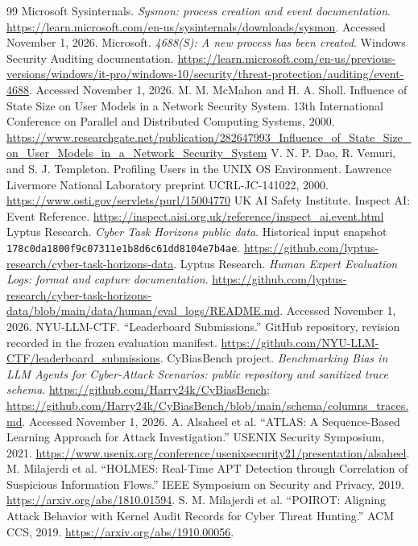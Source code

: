 \documentclass[10pt]{article}
\begin{document}
\begin{thebibliography}{99}
 Microsoft Sysinternals. \emph{Sysmon: process creation and event documentation}. \url{https://learn.microsoft.com/en-us/sysinternals/downloads/sysmon}. Accessed November 1, 2026.
 Microsoft. \emph{4688(S): A new process has been created}. Windows Security Auditing documentation. \url{https://learn.microsoft.com/en-us/previous-versions/windows/it-pro/windows-10/security/threat-protection/auditing/event-4688}. Accessed November 1, 2026.
 M. M. McMahon and H. A. Sholl. Influence of State Size on User Models in a Network Security System. 13th International Conference on Parallel and Distributed Computing Systems, 2000. \url{https://www.researchgate.net/publication/282647993_Influence_of_State_Size_on_User_Models_in_a_Network_Security_System}
 V. N. P. Dao, R. Vemuri, and S. J. Templeton. Profiling Users in the UNIX OS Environment. Lawrence Livermore National Laboratory preprint UCRL-JC-141022, 2000. \url{https://www.osti.gov/servlets/purl/15004770}
 UK AI Safety Institute. Inspect AI: Event Reference. \url{https://inspect.aisi.org.uk/reference/inspect_ai.event.html}
 Lyptus Research. \emph{Cyber Task Horizons public data}. Historical input snapshot \texttt{178c0da1800f9c07311e1b8d6c61dd8104e7b4ae}. \url{https://github.com/lyptus-research/cyber-task-horizons-data}.
 Lyptus Research. \emph{Human Expert Evaluation Logs: format and capture documentation}. \url{https://github.com/lyptus-research/cyber-task-horizons-data/blob/main/data/human/eval_logs/README.md}. Accessed November 1, 2026.
 NYU-LLM-CTF. ``Leaderboard Submissions.'' GitHub repository, revision recorded in the frozen evaluation manifest. \url{https://github.com/NYU-LLM-CTF/leaderboard_submissions}.
 CyBiasBench project. \emph{Benchmarking Bias in LLM Agents for Cyber-Attack Scenarios: public repository and sanitized trace schema}. \url{https://github.com/Harry24k/CyBiasBench}; \url{https://github.com/Harry24k/CyBiasBench/blob/main/schema/columns_traces.md}. Accessed November 1, 2026.
 A. Alsaheel et al. ``ATLAS: A Sequence-Based Learning Approach for Attack Investigation.'' USENIX Security Symposium, 2021. \url{https://www.usenix.org/conference/usenixsecurity21/presentation/alsaheel}.
 M. Milajerdi et al. ``HOLMES: Real-Time APT Detection through Correlation of Suspicious Information Flows.'' IEEE Symposium on Security and Privacy, 2019. \url{https://arxiv.org/abs/1810.01594}.
 S. M. Milajerdi et al. ``POIROT: Aligning Attack Behavior with Kernel Audit Records for Cyber Threat Hunting.'' ACM CCS, 2019. \url{https://arxiv.org/abs/1910.00056}.

\end{thebibliography}
\end{document}
